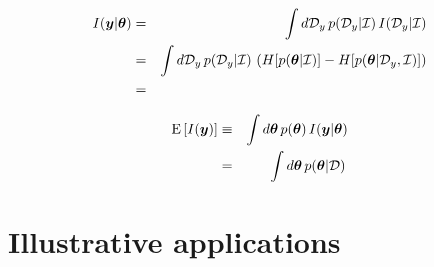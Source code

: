 \documentclass[aps,pre,twocolumn,nofootinbib,superscriptaddress,linenumbers]{revtex4-1}
\newcommand{\bfv}[1]{{\mbox{\boldmath{$#1$}}}}
\newcommand{\Ept}[1] {{\mathrm E}\left[ #1 \right]}
\begin{document}
\begin{eqnarray}
I(\bfv{y} | \bfv{\theta}) &=& \int d\mathcal{D}_y \, p(\mathcal{D}_y | \mathcal{I}) \, I(\mathcal{D}_y | \mathcal{I}) \nonumber \\
&=& \int d\mathcal{D}_y \, p(\mathcal{D}_y | \mathcal{I}) \, \left( H[p(\bfv{\theta} | \mathcal{I})] - H[p(\bfv{\theta} | \mathcal{D}_y, \mathcal{I})] \right) \nonumber \\
&=&
\end{eqnarray}

\begin{eqnarray}
\Ept{I(\bfv{y})} &\equiv& \int d\bfv{\theta} \, p(\bfv{\theta}) \, I(\bfv{y} | \bfv{\theta}) \nonumber \\
&=& \int d\bfv{\theta} \, p(\bfv{\theta} | \mathcal{D}) \, 
\end{eqnarray}



\section{Illustrative applications}
\label{section:applications}

%
%

%
\end{document}
